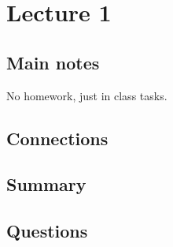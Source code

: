 \section{Lecture 1}

\subsection{Main notes}

No homework, just in class tasks.



\subsection{Connections}


\subsection{Summary}


\subsection{Questions}
